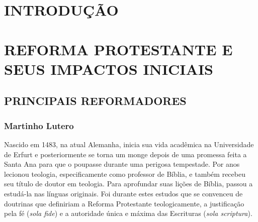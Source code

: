 \documentclass[
    article,            %
	12pt,				%
	oneside,			%
	a4paper,			%
	chapter=TITLE,		%
	section=TITLE,		%
	english,			%
	french,				%
	spanish,			%
	brazil				%
	]{abntex2}
\begin{document}



\imprimircapa

\imprimirfolhaderosto

\tableofcontents*
\cleardoublepage

\textual
\pagestyle{simple}


\section{INTRODUÇÃO}

\section{REFORMA PROTESTANTE E SEUS IMPACTOS INICIAIS}

\subsection{PRINCIPAIS REFORMADORES}
\subsubsection{Martinho Lutero}
Nascido em 1483, na atual Alemanha, inicia sua vida acadêmica na Universidade de Erfurt e posteriormente se torna um monge depois de uma promessa feita a Santa Ana para que o poupasse durante uma perigosa tempestade. Por anos lecionou teologia, especificamente como professor de Bíblia, e também recebeu seu título de doutor em teologia. Para aprofundar suas lições de Bíblia, passou a estudá-la nas línguas originais. Foi durante estes estudos que se convenceu de doutrinas que definiriam a Reforma Protestante teologicamente, a justificação pela fé (\emph{sola fide}) e a autoridade única e máxima das Escrituras (\emph{sola scriptura}).
\end{document}
